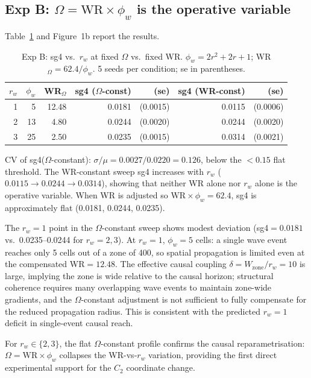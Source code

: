 \documentclass[11pt,a4paper]{article}
\begin{document}
\subsection{Exp B: $\Omega = \mathrm{WR}\times\phi_w$ is the operative variable}

Table~\ref{tab:exp_b} and Figure~1b report the results.

\begin{table}[h]
\centering
\caption{Exp B: sg4 vs.\ $r_w$ at fixed $\Omega$ vs.\ fixed WR.
  $\phi_w = 2r^2+2r+1$; WR$_\Omega = 62.4/\phi_w$.
  5 seeds per condition; se in parentheses.}
\label{tab:exp_b}
\begin{tabular}{rrrrrrr}
\toprule
$r_w$ & $\phi_w$ & WR$_\Omega$ & sg4 ($\Omega$-const) & (se) & sg4 (WR-const) & (se) \\
\midrule
1 & 5  & 12.48 & 0.0181 & (0.0015) & 0.0115 & (0.0006) \\
2 & 13 & 4.80  & 0.0244 & (0.0020) & 0.0244 & (0.0020) \\
3 & 25 & 2.50  & 0.0235 & (0.0015) & 0.0314 & (0.0021) \\
\bottomrule
\end{tabular}
\end{table}

\noindent
CV of sg4($\Omega$-constant): $\sigma/\mu = 0.0027/0.0220 = 0.126$, below the
$< 0.15$ flat threshold.
The WR-constant sweep sg4 increases with $r_w$
($0.0115 \to 0.0244 \to 0.0314$),
showing that neither WR alone nor $r_w$ alone is the operative variable.
When WR is adjusted so $\mathrm{WR}\times\phi_w = 62.4$, sg4 is approximately
flat (0.0181, 0.0244, 0.0235).

The $r_w=1$ point in the $\Omega$-constant sweep shows modest deviation
(sg4$=0.0181$ vs.\ 0.0235--0.0244 for $r_w=2,3$).
At $r_w=1$, $\phi_w=5$ cells: a single wave event reaches only 5 cells out of
a zone of 400, so spatial propagation is limited even at the compensated
WR$=12.48$.
The effective causal coupling $\delta = W_\mathrm{zone}/r_w = 10$ is large,
implying the zone is wide relative to the causal horizon;
structural coherence requires many overlapping wave events to maintain zone-wide
gradients, and the $\Omega$-constant adjustment is not sufficient to fully
compensate for the reduced propagation radius.
This is consistent with the predicted $r_w=1$ deficit in single-event causal reach.

For $r_w \in \{2,3\}$, the flat $\Omega$-constant profile confirms the
causal reparametrisation: $\Omega = \mathrm{WR}\times\phi_w$ collapses
the WR-vs-$r_w$ variation, providing the first direct experimental support for
the $C_2$ coordinate change.
\end{document}
